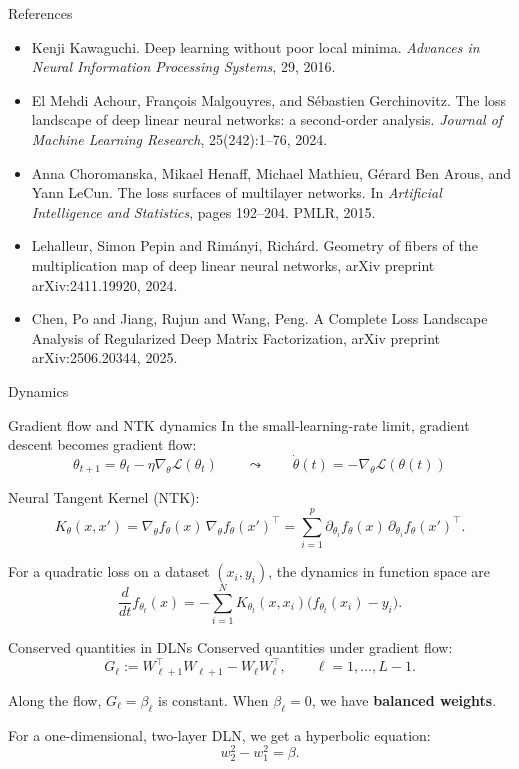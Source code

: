 \documentclass[aspectratio=169,11pt]{beamer}
\newcommand{\sectionframe}[1]{%
  \begin{frame}[plain]
    \centering
    \vfill
    {\Huge #1}
    \vfill
  \end{frame}
}
\begin{document}
\begin{frame}{References}
\begin{itemize}
    \item Kenji Kawaguchi. Deep learning without poor local minima. \textit{Advances in Neural
Information Processing Systems}, 29, 2016.
    \item El Mehdi Achour, François Malgouyres, and Sébastien Gerchinovitz. The loss
landscape of deep linear neural networks: a second-order analysis. \textit{Journal of
Machine Learning Research}, 25(242):1–76, 2024.
    \item Anna Choromanska, Mikael Henaff, Michael Mathieu, Gérard Ben Arous, and
Yann LeCun. The loss surfaces of multilayer networks. In \textit{Artificial Intelligence
and Statistics}, pages 192–204. PMLR, 2015.
    \item Lehalleur, Simon Pepin and Rim{\'a}nyi, Rich{\'a}rd. Geometry of fibers of the multiplication map of deep linear neural networks, arXiv preprint arXiv:2411.19920, 2024.
    \item Chen, Po and Jiang, Rujun and Wang, Peng. A Complete Loss Landscape Analysis of Regularized Deep Matrix Factorization, arXiv preprint arXiv:2506.20344, 2025.
\end{itemize}
\end{frame}
\sectionframe{Dynamics}
\begin{frame}{Gradient flow and NTK dynamics}
  \small
  In the small-learning-rate limit, gradient descent becomes gradient flow:
  \[
    \theta_{t+1}=\theta_t-\eta \nabla_\theta \mathcal{L}(\theta_t)
    \qquad \leadsto \qquad
    \dot{\theta}(t)=-\nabla_\theta \mathcal{L}(\theta(t))
  \]

  Neural Tangent Kernel (NTK):
  \[
    K_{\theta}(x,x')
    =
    \nabla_{\theta} f_{\theta}(x)\,
    \nabla_{\theta} f_{\theta}(x')^{\top}
    =
    \sum_{i=1}^p
    \partial_{\theta_i} f_{\theta}(x)\,
    \partial_{\theta_i} f_{\theta}(x')^{\top}.
  \]

  For a quadratic loss on a dataset $(x_i,y_i)$, the dynamics in function space are
  \[
    \frac{d}{dt}f_{\theta_t}(x)
    =
    -\sum_{i=1}^N
    K_{\theta_t}(x,x_i)\bigl(f_{\theta_t}(x_i)-y_i\bigr).
  \]
\end{frame}
\begin{frame}{Conserved quantities in DLNs}
  Conserved quantities under gradient flow:
  \[
    G_\ell :=
    W_{\ell+1}^{\top}W_{\ell+1}
    -
    W_{\ell}W_{\ell}^{\top},
    \qquad
    \ell=1,\ldots,L-1.
  \]

  Along the flow, $G_\ell=\beta_\ell$ is constant. When $\beta_\ell=0$, we have \textbf{balanced weights}.

  \vspace{0.4cm}

  For a one-dimensional, two-layer DLN, we get a hyperbolic equation:
  \[
  w_2^2-w_1^2=\beta.
  \]

  \vspace{0.4cm}
\end{frame}
\end{document}
